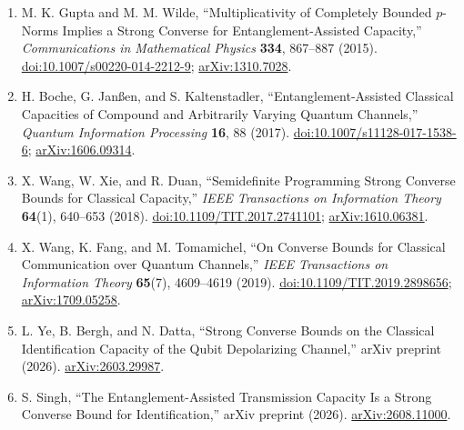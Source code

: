 \begin{enumerate}[label={},leftmargin=4.8em,labelsep=0.5em]
  \item[\textup{[GW15]}]\label{ref:5586-gupta-wilde}
  M. K. Gupta and M. M. Wilde, ``Multiplicativity of Completely Bounded
  $p$-Norms Implies a Strong Converse for Entanglement-Assisted Capacity,''
  \emph{Communications in Mathematical Physics} \textbf{334}, 867--887
  (2015).
  \href{https://doi.org/10.1007/s00220-014-2212-9}{doi:10.1007/s00220-014-2212-9};
  \href{https://arxiv.org/abs/1310.7028}{arXiv:1310.7028}.

  \item[\textup{[BJK17]}]\label{ref:5586-boche-et-al}
  H. Boche, G. Jan{\ss}en, and S. Kaltenstadler, ``Entanglement-Assisted
  Classical Capacities of Compound and Arbitrarily Varying Quantum
  Channels,'' \emph{Quantum Information Processing} \textbf{16}, 88 (2017).
  \href{https://doi.org/10.1007/s11128-017-1538-6}{doi:10.1007/s11128-017-1538-6};
  \href{https://arxiv.org/abs/1606.09314}{arXiv:1606.09314}.

  \item[\textup{[WXD18]}]\label{ref:5586-wang-xie-duan}
  X. Wang, W. Xie, and R. Duan, ``Semidefinite Programming Strong Converse
  Bounds for Classical Capacity,'' \emph{IEEE Transactions on Information
  Theory} \textbf{64}(1), 640--653 (2018).
  \href{https://doi.org/10.1109/TIT.2017.2741101}{doi:10.1109/TIT.2017.2741101};
  \href{https://arxiv.org/abs/1610.06381}{arXiv:1610.06381}.

  \item[\textup{[WFT19]}]\label{ref:5586-wang-fang-tomamichel}
  X. Wang, K. Fang, and M. Tomamichel, ``On Converse Bounds for Classical
  Communication over Quantum Channels,'' \emph{IEEE Transactions on
  Information Theory} \textbf{65}(7), 4609--4619 (2019).
  \href{https://doi.org/10.1109/TIT.2019.2898656}{doi:10.1109/TIT.2019.2898656};
  \href{https://arxiv.org/abs/1709.05258}{arXiv:1709.05258}.

  \item[\textup{[YBD26]}]\label{ref:5586-ye-bergh-datta}
  L. Ye, B. Bergh, and N. Datta, ``Strong Converse Bounds on the Classical
  Identification Capacity of the Qubit Depolarizing Channel,'' arXiv
  preprint (2026).
  \href{https://arxiv.org/abs/2603.29987}{arXiv:2603.29987}.

  \item[\textup{[Sin26]}]\label{ref:5586-singh}
  S. Singh, ``The Entanglement-Assisted Transmission Capacity Is a Strong
  Converse Bound for Identification,'' arXiv preprint (2026).
  \href{https://arxiv.org/abs/2608.11000}{arXiv:2608.11000}.


\end{enumerate}
